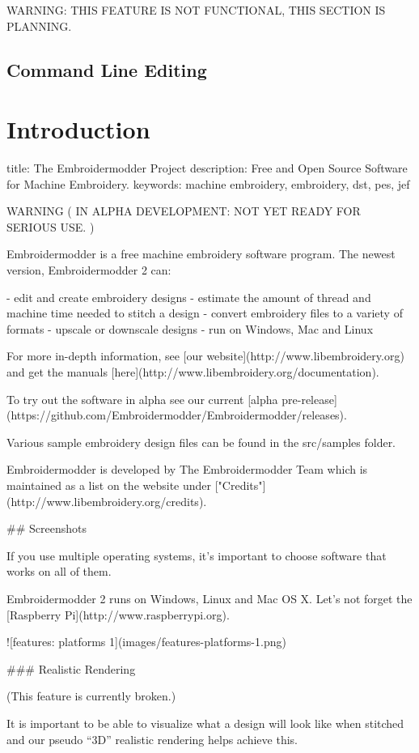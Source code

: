 WARNING: THIS FEATURE IS NOT FUNCTIONAL, THIS SECTION IS PLANNING.

\subsection{Command Line Editing}

\section{Introduction}

title: The Embroidermodder Project
description: Free and Open Source Software for Machine Embroidery.
keywords: machine embroidery, embroidery, dst, pes, jef

WARNING  ( IN ALPHA DEVELOPMENT: NOT YET READY FOR SERIOUS USE. )

Embroidermodder is a free machine embroidery software program.
The newest version, Embroidermodder 2 can:

- edit and create embroidery designs
- estimate the amount of thread and machine time needed to stitch a design
- convert embroidery files to a variety of formats
- upscale or downscale designs
- run on Windows, Mac and Linux

For more in-depth information, see [our website](http://www.libembroidery.org)
and get the manuals [here](http://www.libembroidery.org/documentation).

To try out the software in alpha see our current
[alpha pre-release](https://github.com/Embroidermodder/Embroidermodder/releases).

Various sample embroidery design files can be found in
the src/samples folder.

Embroidermodder is developed by The Embroidermodder Team which is maintained as a
list on the website under ["Credits"](http://www.libembroidery.org/credits).

## Screenshots

If you use multiple operating systems, it's important to choose software that works on all of them.

Embroidermodder 2 runs on Windows, Linux and Mac OS X. Let's not forget the [Raspberry
Pi](http://www.raspberrypi.org).

![features: platforms 1](images/features-platforms-1.png)

### Realistic Rendering

(This feature is currently broken.)

It is important to be able to visualize what a design will look like when stitched and our
pseudo ``3D'' realistic rendering helps achieve this.

